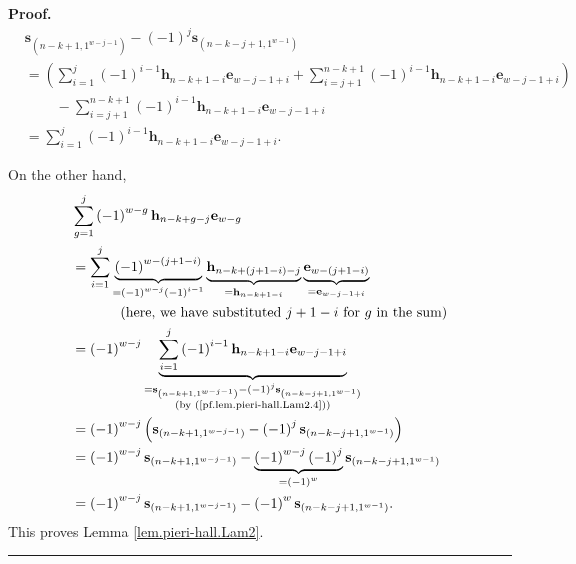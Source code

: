 \documentclass[numbers=enddot,12pt,final,onecolumn,notitlepage]{scrartcl}%
\theoremstyle{definition}
\newenvironment{proof}[1][Proof]{\noindent\textbf{#1.} }{\ \rule{0.5em}{0.5em}}
\let\sumnonlimits\sum
\renewcommand{\sum}{\sumnonlimits\limits}
\begin{document}
\begin{proof}
\begin{align}
&  \mathbf{s}_{\left(  n-k+1,1^{w-j-1}\right)  }-\left(  -1\right)
^{j}\mathbf{s}_{\left(  n-k-j+1,1^{w-1}\right)  }\nonumber\\
&  =\left(  \sum_{i=1}^{j}\left(  -1\right)  ^{i-1}\mathbf{h}_{n-k+1-i}%
\mathbf{e}_{w-j-1+i}+\sum_{i=j+1}^{n-k+1}\left(  -1\right)  ^{i-1}%
\mathbf{h}_{n-k+1-i}\mathbf{e}_{w-j-1+i}\right) \nonumber\\
&  \ \ \ \ \ \ \ \ \ \ -\sum_{i=j+1}^{n-k+1}\left(  -1\right)  ^{i-1}%
\mathbf{h}_{n-k+1-i}\mathbf{e}_{w-j-1+i}\nonumber\\
&  =\sum_{i=1}^{j}\left(  -1\right)  ^{i-1}\mathbf{h}_{n-k+1-i}\mathbf{e}%
_{w-j-1+i}. \label{pf.lem.pieri-hall.Lam2.4}%
\end{align}


On the other hand,%
\begin{align*}
&  \sum_{g=1}^{j}\left(  -1\right)  ^{w-g}\mathbf{h}_{n-k+g-j}\mathbf{e}%
_{w-g}\\
&  =\sum_{i=1}^{j}\underbrace{\left(  -1\right)  ^{w-\left(  j+1-i\right)  }%
}_{=\left(  -1\right)  ^{w-j}\left(  -1\right)  ^{i-1}}\underbrace{\mathbf{h}%
_{n-k+\left(  j+1-i\right)  -j}}_{=\mathbf{h}_{n-k+1-i}}\underbrace{\mathbf{e}%
_{w-\left(  j+1-i\right)  }}_{=\mathbf{e}_{w-j-1+i}}\\
&  \ \ \ \ \ \ \ \ \ \ \left(  \text{here, we have substituted }j+1-i\text{
for }g\text{ in the sum}\right) \\
&  =\left(  -1\right)  ^{w-j}\underbrace{\sum_{i=1}^{j}\left(  -1\right)
^{i-1}\mathbf{h}_{n-k+1-i}\mathbf{e}_{w-j-1+i}}_{\substack{=\mathbf{s}%
_{\left(  n-k+1,1^{w-j-1}\right)  }-\left(  -1\right)  ^{j}\mathbf{s}_{\left(
n-k-j+1,1^{w-1}\right)  }\\\text{(by (\ref{pf.lem.pieri-hall.Lam2.4}))}}}\\
&  =\left(  -1\right)  ^{w-j}\left(  \mathbf{s}_{\left(  n-k+1,1^{w-j-1}%
\right)  }-\left(  -1\right)  ^{j}\mathbf{s}_{\left(  n-k-j+1,1^{w-1}\right)
}\right) \\
&  =\left(  -1\right)  ^{w-j}\mathbf{s}_{\left(  n-k+1,1^{w-j-1}\right)
}-\underbrace{\left(  -1\right)  ^{w-j}\left(  -1\right)  ^{j}}_{=\left(
-1\right)  ^{w}}\mathbf{s}_{\left(  n-k-j+1,1^{w-1}\right)  }\\
&  =\left(  -1\right)  ^{w-j}\mathbf{s}_{\left(  n-k+1,1^{w-j-1}\right)
}-\left(  -1\right)  ^{w}\mathbf{s}_{\left(  n-k-j+1,1^{w-1}\right)  }.
\end{align*}
This proves Lemma \ref{lem.pieri-hall.Lam2}.
\end{proof}
\end{document}
